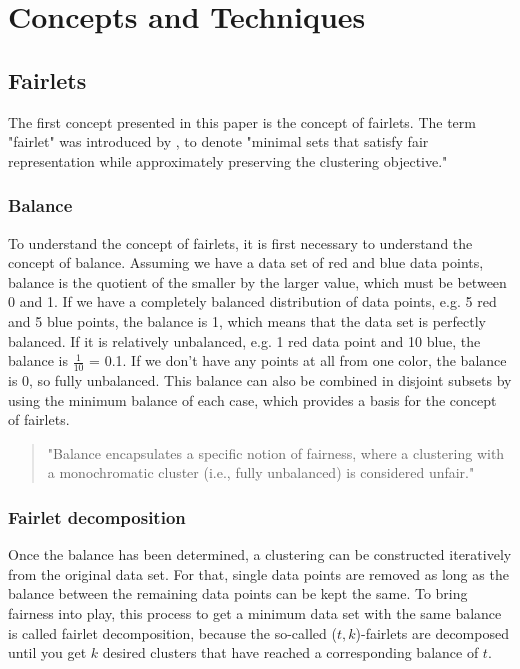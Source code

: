 \section{Concepts and Techniques}


\subsection{Fairlets}
\label{fairlets}

The first concept presented in this paper is the concept of fairlets. The term "fairlet" was introduced by  \textcite[]{Chierichetti2018}, to denote "minimal sets that satisfy fair representation
while approximately preserving the clustering objective." \autocite[1]{Chierichetti2018}

\subsubsection{Balance}

To understand the concept of fairlets, it is first necessary to understand the concept of balance. Assuming we have a data set of red and blue data points, balance is the quotient of the smaller by the larger value, which must be between 0 and 1. If we have a completely balanced distribution of data points, e.g. 5 red and 5 blue points, the balance is 1, which means that the data set is perfectly balanced. If it is relatively unbalanced, e.g. 1 red data point and 10 blue, the balance is $\frac{1}{10}$ = 0.1. If we don't have any points at all from one color, the balance is 0, so fully unbalanced. This balance can also be combined in disjoint subsets by using the minimum balance of each case, which provides a basis for the concept of fairlets. \autocite[4]{Chierichetti2018}

\begin{quote}
"Balance encapsulates a specific notion of fairness, where a clustering with a monochromatic cluster (i.e., fully unbalanced) is considered unfair."

\autocite[4]{Chierichetti2018}
\end{quote}

\subsubsection{Fairlet decomposition}

Once the balance has been determined, a clustering can be constructed iteratively from the original data set. For that, single data points are removed as long as the balance between the remaining data points can be kept the same. To bring fairness into play, this process to get a minimum data set with the same balance is called fairlet decomposition, because the so-called ($t, k$)-fairlets are decomposed until you get $k$ desired clusters that have reached a corresponding balance of $t$. \autocite[4]{Chierichetti2018}

